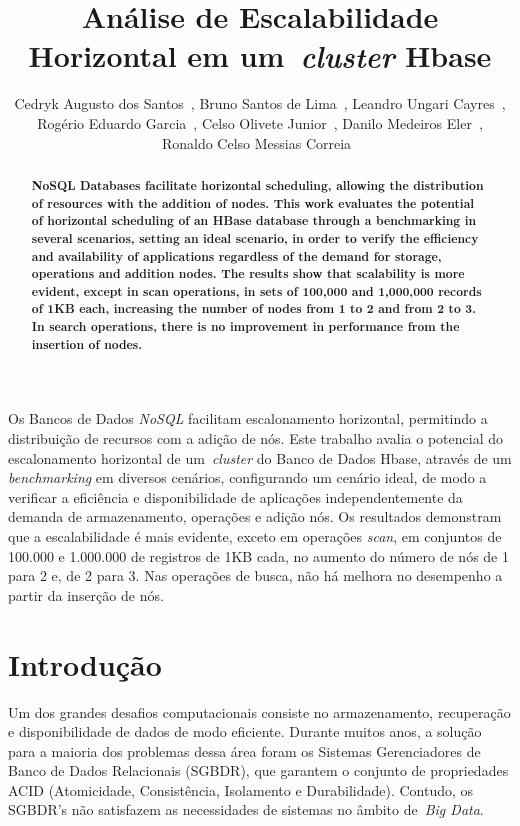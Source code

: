 \documentclass[12pt]{article}
\title{Análise de Escalabilidade Horizontal em um~\emph{cluster}  Hbase}
\author{Cedryk Augusto dos Santos~\inst{1}, Bruno Santos de Lima~\inst{1}, Leandro Ungari Cayres~\inst{1},\\Rogério Eduardo Garcia~\inst{1}, Celso Olivete Junior~\inst{1}, Danilo Medeiros Eler~\inst{1},\\ Ronaldo Celso Messias Correia~\inst{1}}
\begin{document}
 

\maketitle


\begin{abstract}
\textbf{NoSQL Databases facilitate horizontal scheduling, allowing the distribution of resources with the addition of nodes. This work evaluates the potential of horizontal scheduling of an HBase database through a benchmarking in several scenarios, setting an ideal scenario, in order to verify the efficiency and availability of applications regardless of the demand for storage, operations and addition nodes. The results show that scalability is more evident, except in scan operations, in sets of 100,000 and 1,000,000 records of 1KB each, increasing the number of nodes from 1 to 2 and from 2 to 3. In search operations, there is no improvement in performance from the insertion of nodes.}
\end{abstract}
     
\begin{resumo} 
Os Bancos de Dados \emph{NoSQL} facilitam escalonamento horizontal, permitindo a distribuição de recursos com a adição de nós. Este trabalho avalia o potencial do escalonamento horizontal de um~\emph{cluster} do Banco de Dados Hbase, através de um \emph{benchmarking} em diversos cenários, configurando um cenário ideal, de modo a verificar a eficiência e disponibilidade de aplicações independentemente da demanda de armazenamento, operações e adição nós. Os resultados demonstram que a escalabilidade é mais evidente, exceto em operações \emph{scan}, em conjuntos de 100.000 e 1.000.000 de registros de 1KB cada, no aumento do número de nós de 1 para 2 e, de 2 para 3. Nas operações de busca, não há melhora no desempenho a partir da inserção de nós.
\end{resumo}


\section{Introdução}
\label{sec:introducao}
 
Um dos grandes desafios computacionais consiste no armazenamento, recuperação e disponibilidade de dados de modo eficiente. Durante muitos anos, a solução para a maioria dos problemas dessa área foram os Sistemas Gerenciadores de Banco de Dados Relacionais (SGBDR), que garantem o conjunto de propriedades ACID (Atomicidade, Consistência, Isolamento e Durabilidade). Contudo, os SGBDR’s não satisfazem as necessidades de sistemas no âmbito de~\emph{Big Data}.%
 
\end{document}
